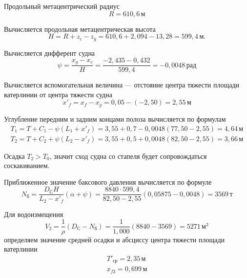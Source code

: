 Продольный метацентрический радиус
\begin{equation*}
    R = 610{,}6\,\text{м}
\end{equation*}

Вычисляется продольная метацентрическая высота
\begin{equation*}
    H = R + z_c - z_g = 610{,}6 + 2{,}094 - 13{,}28 = 599{,}4\,\text{м}.
\end{equation*}

Вычисляется дифферент судна
\begin{equation*}
    \psi = \frac{x_g - x_c}{H} = \frac{-2{,}435 - 0{,}432}{599{,}4} = -0{,}0048\,\text{рад}
\end{equation*}

Вычисляется вспомогательная величина --- отстояние центра тяжести площади ватерлинии от центра тяжести судна
\begin{equation*}
    x'_f = x_f - x_g = 0{,}05 - (-2{,}50) = 2{,}55\,\text{м}
\end{equation*}

Углубление передним и задним концами полоза вычисляется по формулам
\begin{equation*}
    \begin{split}
        T_1 = T + C_1 - \psi (L_1 + x'_f) = 3{,}55 + 0{,}7 - 0{,}0048 (77{,}50 - 2{,}55) = 4{,}64\,\text{м} \\
        T_2 = T + C_2 + \psi (L_2 - x'_f) = 3{,}55 + 0{,}5 + 0{,}0048 (82{,}50 - 2{,}55) = 3{,}66\,\text{м}
    \end{split}
\end{equation*}

Осадка $T_2 > T_0$, значит сход судна со стапеля будет сопровождаться соскакиванием.

Приближенное значение баксового давления вычисляется по формуле
\begin{equation*}
    N_{\text{б}} = \frac{D_{\text{С}} H}{L_2 - x'_f} (\alpha + \psi) = \frac{8840 \cdot 599{,}4}{82{,}50 - 2{,}55} (0{,}05875 - 0{,}0048) = 3569\,\text{т}
\end{equation*}

Для водоизмещения
\begin{equation*}
    V_2 = \frac{1}{\rho} (D_{\text{С}} - N_{\text{б}}) = \frac{1}{1{,}000} (8840 - 3569) = 5271\,\text{м}^3
\end{equation*}
определяем значение средней осадки и абсциссу центра тяжести площади ватерлинии
\begin{equation*}
    \begin{split}
        T'_{\text{ср}} = 2{,}35\,\text{м} \\
        x_{f2} = 0{,}699\,\text{м}
    \end{split}
\end{equation*}

